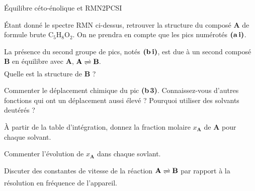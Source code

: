 \begin{exercise}{\'Equilibre céto-énolique et RMN}{2}{PCSI}
\begin{questions}
\question \'Etant donné le spectre RMN ci-dessus, retrouver la structure du composé \textbf{A} de formule brute $\mathrm{C_5H_8O_2}$. On ne prendra en compte que les pics numérotés $\textbf{(a\,i)}$.

\question La présence du second groupe de pics, notés $\textbf{(b\,i)}$, est due à un second composé \textbf{B} en équilibre avec \textbf{A}, $\textbf{A} \xrightleftharpoons{} \textbf{B}.$ \\
Quelle est la structure de \textbf{B} ?

\question Commenter le déplacement chimique du pic \textbf{(b{\tiny\,3})}. Connaissez-vous d'autres fonctions qui ont un déplacement aussi élevé ? Pourquoi utiliser des solvants deutérés ?

\question \`A partir de la table d'intégration, donnez la fraction molaire $x_\textbf{A}$ de \textbf{A} pour chaque solvant.

\question Commenter l'évolution de $x_\textbf{A}$ dans chaque sovlant.
\end{questions}

\plusloin Discuter des constantes de vitesse de la réaction $\textbf{A} \xrightleftharpoons{} \textbf{B}$ par rapport à la résolution en fréquence de l'appareil.

\end{exercise}